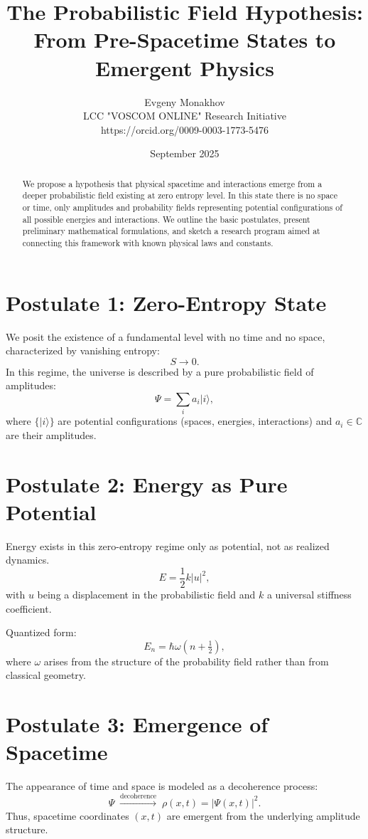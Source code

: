 \documentclass[12pt,a4paper]{article}
\title{The Probabilistic Field Hypothesis:\\
From Pre-Spacetime States to Emergent Physics}
\author{Evgeny Monakhov \\ LCC "VOSCOM ONLINE" Research Initiative \\ https://orcid.org/0009-0003-1773-5476}
\date{September 2025}
\begin{document}
\maketitle

\begin{abstract}
We propose a hypothesis that physical spacetime and interactions emerge from a deeper probabilistic field existing at zero entropy level. In this state there is no space or time, only amplitudes and probability fields representing potential configurations of all possible energies and interactions. We outline the basic postulates, present preliminary mathematical formulations, and sketch a research program aimed at connecting this framework with known physical laws and constants.
\end{abstract}

\section{Postulate 1: Zero-Entropy State}
We posit the existence of a fundamental level with no time and no space, characterized by vanishing entropy:
\[
S \to 0.
\]
In this regime, the universe is described by a pure probabilistic field of amplitudes:
\[
\Psi = \sum_{i} a_i |i\rangle ,
\]
where $\{|i\rangle\}$ are potential configurations (spaces, energies, interactions) and $a_i \in \mathbb{C}$ are their amplitudes.

\section{Postulate 2: Energy as Pure Potential}
Energy exists in this zero-entropy regime only as potential, not as realized dynamics. 
\[
E = \frac{1}{2}k |u|^2 ,
\]
with $u$ being a displacement in the probabilistic field and $k$ a universal stiffness coefficient.

Quantized form:
\[
E_n = \hbar \omega \left(n + \tfrac{1}{2}\right),
\]
where $\omega$ arises from the structure of the probability field rather than from classical geometry.

\section{Postulate 3: Emergence of Spacetime}
The appearance of time and space is modeled as a decoherence process:
\[
\Psi \;\xrightarrow{\text{decoherence}}\; \rho(x,t) = |\Psi(x,t)|^2 .
\]
Thus, spacetime coordinates $(x,t)$ are emergent from the underlying amplitude structure.
\end{document}
